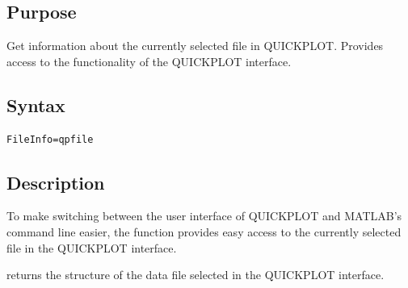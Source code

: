 \subsection*{Purpose}
Get information about the currently selected file in QUICKPLOT.
Provides access to the functionality of the QUICKPLOT interface.

\subsection*{Syntax}
\begin{Verbatim}
FileInfo=qpfile
\end{Verbatim}

\subsection*{Description}
To make switching between the user interface of QUICKPLOT and MATLAB's command line easier, the  function provides easy access to the currently selected file in the QUICKPLOT interface.

 returns the structure of the data file selected in the QUICKPLOT interface.
